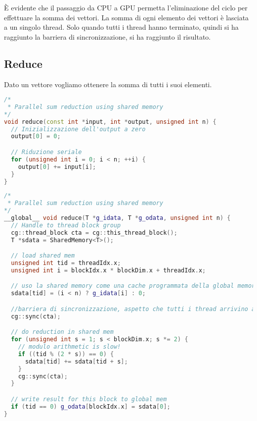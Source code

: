 \subsubsection{}

È  evidente che il passaggio da CPU a GPU permetta l'eliminazione del ciclo per effettuare la somma dei vettori. La somma di ogni elemento dei vettori è lasciata a un singolo thread. Solo quando tutti i thread hanno terminato, quindi si ha raggiunto  la barriera di sincronizzazione, si ha raggiunto il risultato.

\subsection{Reduce}

Dato un vettore vogliamo ottenere la somma di tutti i suoi elementi. 

\begin{lstlisting}[language=C++, caption={Implementazione sequenziale}]
/*
 * Parallel sum reduction using shared memory
*/
void reduce(const int *input, int *output, unsigned int n) {
  // Inizializzazione dell'output a zero
  output[0] = 0;

  // Riduzione seriale
  for (unsigned int i = 0; i < n; ++i) {
    output[0] += input[i];
  }
}
\end{lstlisting}

\begin{lstlisting}[language=C++, caption={Implementazione CUDA}]
/*
 * Parallel sum reduction using shared memory
*/
__global__ void reduce(T *g_idata, T *g_odata, unsigned int n) {
  // Handle to thread block group
  cg::thread_block cta = cg::this_thread_block();
  T *sdata = SharedMemory<T>();

  // load shared mem
  unsigned int tid = threadIdx.x;
  unsigned int i = blockIdx.x * blockDim.x + threadIdx.x;

  // uso la shared memory come una cache programmata della global memory
  sdata[tid] = (i < n) ? g_idata[i] : 0;

  //barriera di sincronizzazione, aspetto che tutti i thread arrivino a questo punto.
  cg::sync(cta);

  // do reduction in shared mem
  for (unsigned int s = 1; s < blockDim.x; s *= 2) {
    // modulo arithmetic is slow!
    if ((tid % (2 * s)) == 0) {
      sdata[tid] += sdata[tid + s];
    }
    cg::sync(cta);
  }

  // write result for this block to global mem
  if (tid == 0) g_odata[blockIdx.x] = sdata[0];
}
\end{lstlisting}


